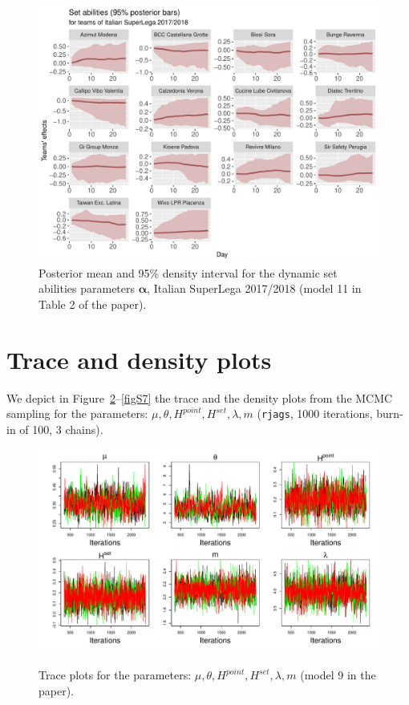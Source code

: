 \documentclass{statsoc}
\begin{document}
\begin{figure}
\centering
\includegraphics[scale=0.75]{Dynamics/NegBin_ZIP_dynamicset_abilities.pdf}
\caption{Posterior mean and 95\% density interval for the dynamic set abilities parameters $\bm{\alpha}$, Italian SuperLega 2017/2018 (model 11 in Table 2 of the paper).}
\label{fig16}
\end{figure}

\section*{Trace and density plots}

We depict in Figure~\ref{figS6}--\ref{figS7} the trace and the density plots from the MCMC sampling for the parameters: $\mu, \theta, H^{point}, H^{set},\lambda, m$ (\texttt{rjags}, 1000 iterations, burn-in of 100, 3 chains).

\begin{figure}
\centering
\includegraphics[scale=0.6]{Traceplots/Traceplots.pdf}\\
\caption{Trace plots for the parameters: $\mu, \theta, H^{point}, H^{set},\lambda, m$ (model 9 in the paper).}
\label{figS6}
\end{figure}
\end{document}
